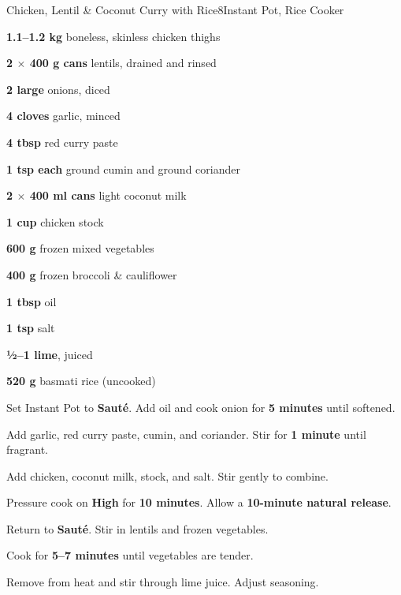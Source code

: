 \begin{recipe}{Chicken, Lentil \& Coconut Curry with Rice}{8}{Instant Pot, Rice Cooker}

\begin{ingredients}
  \item \textbf{1.1--1.2 kg} boneless, skinless chicken thighs
  \item \textbf{2 $\times$ 400 g cans} lentils, drained and rinsed
  \item \textbf{2 large} onions, diced
  \item \textbf{4 cloves} garlic, minced
  \item \textbf{4 tbsp} red curry paste
  \item \textbf{1 tsp each} ground cumin and ground coriander

  \item \textbf{2 $\times$ 400 ml cans} light coconut milk
  \item \textbf{1 cup} chicken stock
  \item \textbf{600 g} frozen mixed vegetables
  \item \textbf{400 g} frozen broccoli \& cauliflower
  \item \textbf{1 tbsp} oil
  \item \textbf{1 tsp} salt
  \item \textbf{½--1 lime}, juiced
  \item \textbf{520 g} basmati rice (uncooked)
\end{ingredients}

\begin{method}
  \item Set Instant Pot to \textbf{Sauté}. Add oil and cook onion for \textbf{5 minutes} until softened.
  \item Add garlic, red curry paste, cumin, and coriander. Stir for \textbf{1 minute} until fragrant.
  \item Add chicken, coconut milk, stock, and salt. Stir gently to combine.
  \item Pressure cook on \textbf{High} for \textbf{10 minutes}. Allow a \textbf{10-minute natural release}.
  \item Return to \textbf{Sauté}. Stir in lentils and frozen vegetables.
  \item Cook for \textbf{5--7 minutes} until vegetables are tender.
  \item Remove from heat and stir through lime juice. Adjust seasoning.
\end{method}


\end{recipe}
